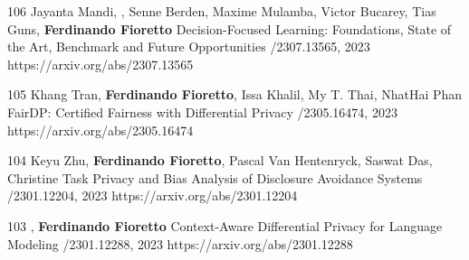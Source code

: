 \begin{pubs}
\wsentry
	{106}
	{Jayanta Mandi, , Senne Berden, Maxime Mulamba, Victor Bucarey, Tias Guns, {\bf Ferdinando Fioretto}} 
	{Decision-Focused Learning: Foundations, State of the Art, Benchmark and Future Opportunities}
	{/2307.13565, 2023}
	{https://arxiv.org/abs/2307.13565}

\wsentry
	{105}
	{Khang Tran, {\bf Ferdinando Fioretto}, Issa Khalil, My T. Thai, NhatHai Phan} 
	{FairDP: Certified Fairness with Differential Privacy}
	{/2305.16474, 2023}
	{https://arxiv.org/abs/2305.16474}

\wsentry 
	{104}%
	{Keyu Zhu, {\bf Ferdinando Fioretto}, Pascal Van Hentenryck, Saswat Das, Christine Task}
	{Privacy and Bias Analysis of Disclosure Avoidance Systems}
	{/2301.12204, 2023}
	{https://arxiv.org/abs/2301.12204}

\wsentry 
	{103}%
	{, {\bf Ferdinando Fioretto}}
	{Context-Aware Differential Privacy for Language Modeling}
	{/2301.12288, 2023}
	{https://arxiv.org/abs/2301.12288}




\end{pubs}
